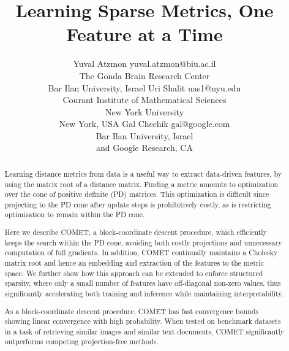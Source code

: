 \documentclass[twoside,11pt]{article}
\newcommand\todo[1]{\textbf{<ToDo:#1}!>}
\begin{document}
\title{Learning Sparse Metrics, One Feature at a Time}


\author{\name Yuval Atzmon \email yuval.atzmon@biu.ac.il \\
       \addr The Gonda Brain Research Center\\
       Bar Ilan University, Israel
       \AND
       \name Uri Shalit \email uas1@nyu.edu \\
       \addr Courant Institute of Mathematical Sciences \\
       New York University\\
       New York, USA
       \AND
      \name Gal Chechik \email gal@google.com \\
       \addr Bar Ilan University, Israel\\
       and Google Research, CA}
\editor{\todo{Editor Name?} }

\maketitle

\begin{abstract}%

Learning distance metrics from data is a useful way to extract data-driven features, by using the matrix root of a distance matrix. Finding a metric amounts to optimization over the cone of positive definite (PD) matrices. This optimization is difficult since projecting to the PD cone after update steps is prohibitively costly, as is restricting optimization to remain within the PD cone.

Here we describe COMET, a block-coordinate descent procedure, which efficiently keeps the search within the PD cone, avoiding both costly projections and unnecessary computation of full gradients. In addition, COMET continually maintains a Cholesky matrix root and hence an embedding and extraction of the features to the metric space. We further show how this approach can be extended to enforce structured sparsity, where only a small number of features have off-diagonal non-zero values, thus significantly accelerating both training and inference while maintaining interpretability. 

As a block-coordinate descent procedure, COMET has fast convergence bounds showing linear convergence with high probability. When tested on benchmark datasets in a task of retrieving similar images and similar text documents, COMET significantly outperforms competing projection-free methods.


\end{abstract}
\end{document}
